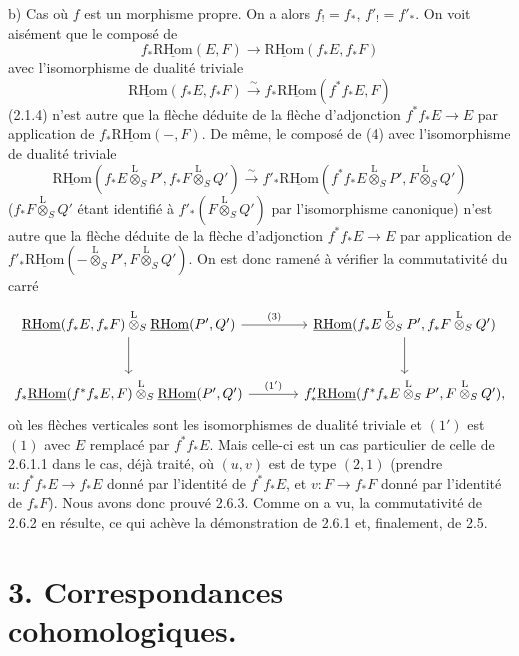\documentclass[11pt]{article}
\newcommand{\R}{\mathrm{R}}\newcommand{\RHomCore}{\mathrm{RHom}}
\providecommand{\RHom}{\RHomCore}
\providecommand{\uRHom}{\underline{\RHom}}
\providecommand{\RHom}{\RHomCore}
\providecommand{\RHom}{\R\mathcal{H}om}
\providecommand{\R}{\mathrm R}
\providecommand{\RHom}{\RHomCore}
\begin{document}
b) Cas où $f$ est un morphisme propre. On a alors $f_!=f_*$, $f'_!=f'_*$. On voit aisément que le composé de
\[
f_*\uRHom(E,F)\longrightarrow\uRHom(f_*E,f_*F)
\]
avec l'isomorphisme de dualité triviale
\[
\uRHom(f_*E,f_*F)\xrightarrow{\sim}f_*\uRHom(f^{*}f_*E,F)
\]
(2.1.4) n'est autre que la flèche déduite de la flèche d'adjonction $f^{*}f_*E\to E$ par application de $f_*\uRHom(-,F)$. De même, le composé de (4) avec l'isomorphisme de dualité triviale
\[
\uRHom(f_*E\overset{\mathrm{L}}{\otimes}_SP',f_*F\overset{\mathrm{L}}{\otimes}_SQ')\xrightarrow{\sim}f'_*\uRHom(f^{*}f_*E\overset{\mathrm{L}}{\otimes}_SP',F\overset{\mathrm{L}}{\otimes}_SQ')
\]
($f_*F\overset{\mathrm{L}}{\otimes}_SQ'$ étant identifié à $f'_*(F\overset{\mathrm{L}}{\otimes}_SQ')$ par l'isomorphisme canonique) n'est autre que la flèche déduite de la flèche d'adjonction $f^{*}f_*E\to E$ par application de $f'_*\uRHom(-\overset{\mathrm{L}}{\otimes}_SP',F\overset{\mathrm{L}}{\otimes}_SQ')$. On est donc ramené à vérifier la commutativité du carré
\[
\begin{tikzcd}[column sep=large,row sep=large]
\uRHom(f_*E,f_*F)\overset{\mathrm{L}}{\otimes}_S\uRHom(P',Q') \arrow[r,"(3)"] \arrow[d] & \uRHom(f_*E\overset{\mathrm{L}}{\otimes}_SP',f_*F\overset{\mathrm{L}}{\otimes}_SQ') \arrow[d]\\
f_*\uRHom(f^{*}f_*E,F)\overset{\mathrm{L}}{\otimes}_S\uRHom(P',Q') \arrow[r,"(1')"] & f'_*\uRHom(f^{*}f_*E\overset{\mathrm{L}}{\otimes}_SP',F\overset{\mathrm{L}}{\otimes}_SQ'),
\end{tikzcd}
\]
où les flèches verticales sont les isomorphismes de dualité triviale et $(1')$ est $(1)$ avec $E$ remplacé par $f^{*}f_*E$. Mais celle-ci est un cas particulier de celle de 2.6.1.1 dans le cas, déjà traité, où $(u,v)$ est de type $(2,1)$ (prendre $u:f^{*}f_*E\to f_*E$ donné par l'identité de $f^{*}f_*E$, et $v:F\to f_*F$ donné par l'identité de $f_*F$). Nous avons donc prouvé 2.6.3. Comme on a vu, la commutativité de 2.6.2 en résulte, ce qui achève la démonstration de 2.6.1 et, finalement, de 2.5.

\clearpage
\section*{3. Correspondances cohomologiques.}
\end{document}
